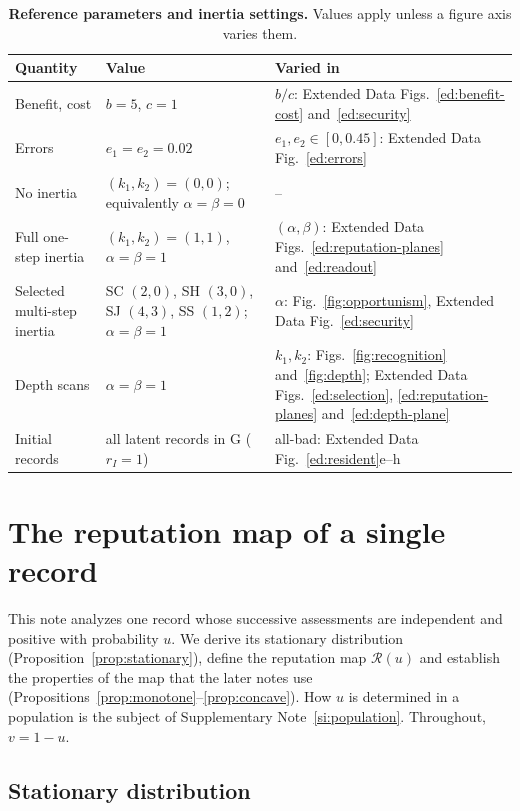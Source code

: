 \documentclass[10pt]{wlscirep}
\newcommand{\Rmap}{\mathscr{R}}            %
\theoremstyle{plain}
\theoremstyle{remark}
\begin{document}
\begin{table}[!htbp]
\centering
\caption{\textbf{Reference parameters and inertia settings.} Values apply unless a figure axis varies them.}
\label{tab:si-parameters}
\small
\begin{tabular}{@{}lll@{}}
\toprule
Quantity & Value & Varied in\\
\midrule
Benefit, cost & $b=5$, $c=1$ & $b/c$: Extended Data Figs.~\ref{ed:benefit-cost} and~\ref{ed:security}\\
Errors & $e_1=e_2=0.02$ & $e_1,e_2\in[0,0.45]$: Extended Data Fig.~\ref{ed:errors}\\
No inertia & $(k_1,k_2)=(0,0)$; equivalently $\alpha=\beta=0$ & --\\
Full one-step inertia & $(k_1,k_2)=(1,1)$, $\alpha=\beta=1$ & $(\alpha,\beta)$: Extended Data Figs.~\ref{ed:reputation-planes} and~\ref{ed:readout}\\
Selected multi-step inertia & SC $(2,0)$, SH $(3,0)$, SJ $(4,3)$, SS $(1,2)$; $\alpha=\beta=1$ & $\alpha$: Fig.~\ref{fig:opportunism}, Extended Data Fig.~\ref{ed:security}\\
Depth scans & $\alpha=\beta=1$ & $k_1,k_2$: Figs.~\ref{fig:recognition} and~\ref{fig:depth}; Extended Data Figs.~\ref{ed:selection}, \ref{ed:reputation-planes} and~\ref{ed:depth-plane}\\
Initial records & all latent records in G ($r_I=1$) & all-bad: Extended Data Fig.~\ref{ed:resident}e--h\\
\bottomrule
\end{tabular}
\end{table}

\FloatBarrier
\section{The reputation map of a single record}
\label{si:map}

This note analyzes one record whose successive assessments are independent and positive with probability $u$. We derive its stationary distribution (Proposition~\ref{prop:stationary}), define the reputation map $\Rmap(u)$ and establish the properties of the map that the later notes use (Propositions~\ref{prop:monotone}--\ref{prop:concave}). How $u$ is determined in a population is the subject of Supplementary Note~\ref{si:population}. Throughout, $v=1-u$.

\subsection{Stationary distribution}
\end{document}
